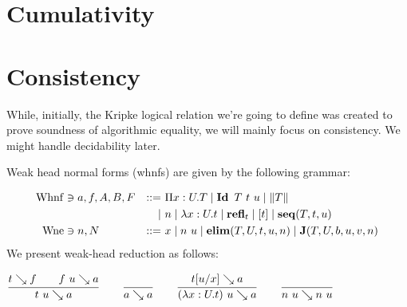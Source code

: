 \documentclass[a4paper,english]{lipics-utf8x}
\begin{document}
  \begin{mathc}
  \end{mathc}

  \section{Cumulativity}

  \begin{mathc}
    \qquad
  \end{mathc}

  \begin{mathc}
    \qquad
  \end{mathc}

  \section{Consistency}

  While, initially, the Kripke logical relation we're going to define was
  created to prove soundness of algorithmic equality, we will mainly focus
  on consistency. We might handle decidability later.


  Weak head normal forms (whnfs) are given by the following grammar:

  \begin{align*}
    \operatorname{Whnf} &\ni a,f,A,B,F &::=~& \Pi x:U.T \mid \operatorname{\mathbf{Id}~} T\ t\ u \mid \|T\| \\
        &&\mid~& n \mid \lambda x:U.t \mid \operatorname{\mathbf{refl}}_t \mid [t] \mid \operatorname{\mathbf{seq}}(T,t,u) \\
    \operatorname{Wne}  &\ni n,N &::=~& x \mid n~u \mid \operatorname{\mathbf{elim}}(T,U,t,u,n) \mid \operatorname{\mathbf{J}} (T,U,b,u,v,n)
  \end{align*}
  We present weak-head reduction as follows:

  \begin{center}
  \(
    \ru{t \rew f \qquad
        f~u \rew a
      }{t~u \rew a}
    \qquad
    \ru{}{a \rew a}
    \qquad
    \ru{t[u/x] \rew a
      }{(\lambda x:U.t)~u \rew a}
    \qquad
    \ru{}{n~u \rew n~u}
  \)
  \end{center}
\end{document}
